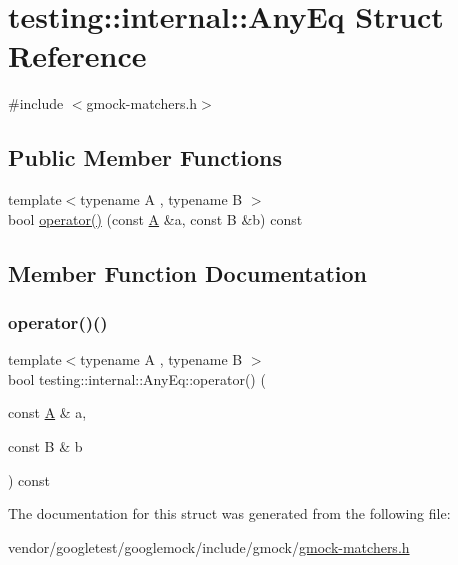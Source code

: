 \hypertarget{structtesting_1_1internal_1_1_any_eq}{}\section{testing\+:\+:internal\+:\+:Any\+Eq Struct Reference}
\label{structtesting_1_1internal_1_1_any_eq}


{\ttfamily \#include $<$gmock-\/matchers.\+h$>$}

\subsection*{Public Member Functions}
\begin{DoxyCompactItemize}
\item 
{\footnotesize template$<$typename A , typename B $>$ }\\bool \hyperlink{structtesting_1_1internal_1_1_any_eq_ad5dc8fa819c5fb541181bdc61fdccbe0}{operator()} (const \hyperlink{namespacetesting_a5e9134d655d2fc9323902348083282e7}{A} \&a, const B \&b) const
\end{DoxyCompactItemize}


\subsection{Member Function Documentation}
\mbox{\label{structtesting_1_1internal_1_1_any_eq_ad5dc8fa819c5fb541181bdc61fdccbe0}} 
\subsubsection{\texorpdfstring{operator()()}{operator()()}}
{\footnotesize\ttfamily template$<$typename A , typename B $>$ \\
bool testing\+::internal\+::\+Any\+Eq\+::operator() (\begin{DoxyParamCaption}\item[{const \hyperlink{namespacetesting_a5e9134d655d2fc9323902348083282e7}{A} \&}]{a,  }\item[{const B \&}]{b }\end{DoxyParamCaption}) const\hspace{0.3cm}{\ttfamily [inline]}}



The documentation for this struct was generated from the following file\+:\begin{DoxyCompactItemize}
\item 
vendor/googletest/googlemock/include/gmock/\hyperlink{gmock-matchers_8h}{gmock-\/matchers.\+h}\end{DoxyCompactItemize}
